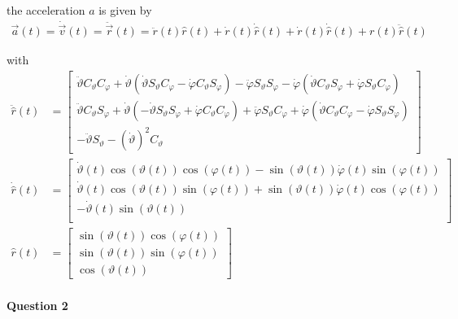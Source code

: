 \documentclass[11pt,a4paper]{article}
\begin{document}
\begin{enumerate}
the acceleration $a$ is given by
\begin{align}
\vec{a}(t)=\dot{\vec{v}}(t)=\ddot{\vec{r}}(t)=\ddot{r}(t)\hat{r}(t)+\dot{r}(t)\dot{\hat{r}}(t)+\dot{r}(t)\dot{\hat{r}}(t)+r(t)\ddot{\hat{r}}(t)
\end{align}

with
\begin{align*}
\ddot{\hat{r}}(t)
&=
\begin{bmatrix}
\ddot{\vartheta}C_\vartheta C_\varphi+\dot{\vartheta}(\dot{\vartheta}S_\vartheta C_\varphi-\dot{\varphi}C_\vartheta S_\varphi)
-
\ddot{\varphi}S_\vartheta S_\varphi-\dot{\varphi}(\dot{\vartheta}C_\vartheta S_\varphi+\dot{\varphi}S_\vartheta C_\varphi)
\\
\ddot{\vartheta}C_\vartheta S_\varphi+\dot{\vartheta}(-\dot{\vartheta}S_\vartheta S_\varphi+\dot{\varphi}C_\vartheta C_\varphi)
+
\ddot{\varphi}S_\vartheta C_\varphi+\dot{\varphi}(\dot{\vartheta}C_\vartheta C_\varphi-\dot{\varphi}S_\vartheta S_\varphi)
\\
-\ddot{\vartheta}S_\vartheta-(\dot{\vartheta})^2C_\vartheta
\end{bmatrix} \\
\dot{\hat{r}}(t)
&=
\begin{bmatrix}
\dot{\vartheta}(t)\cos(\vartheta(t))\cos(\varphi(t))-\sin(\vartheta(t))\dot{\varphi}(t)\sin(\varphi(t)) \\
\dot{\vartheta}(t)\cos(\vartheta(t))\sin(\varphi(t))+\sin(\vartheta(t))\dot{\varphi}(t)\cos(\varphi(t)) \\
-\dot{\vartheta}(t)\sin(\vartheta(t)) \\
\end{bmatrix} \\
\hat{r}(t)
&=
\begin{bmatrix}
\sin(\vartheta(t))\cos(\varphi(t)) \\
\sin(\vartheta(t))\sin(\varphi(t)) \\
\cos(\vartheta(t))
\end{bmatrix}
\end{align*}

\end{enumerate}

\newpage

\paragraph{Question 2}
\end{document}

